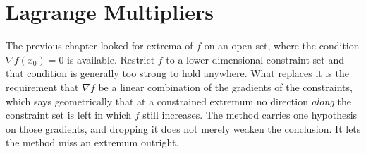 \chapter{Lagrange Multipliers}
\label{ch:lagrange}

The previous chapter looked for extrema of $f$ on an open set, where the condition
$\nabla f(x_0) = 0$ is available. Restrict $f$ to a lower-dimensional constraint set and that
condition is generally too strong to hold anywhere. What replaces it is the requirement that
$\nabla f$ be a linear combination of the gradients of the constraints, which says geometrically
that at a constrained extremum no direction \emph{along} the constraint set is left in which $f$
still increases. The method carries one hypothesis on those gradients, and dropping it does not
merely weaken the conclusion. It lets the method miss an extremum outright.





